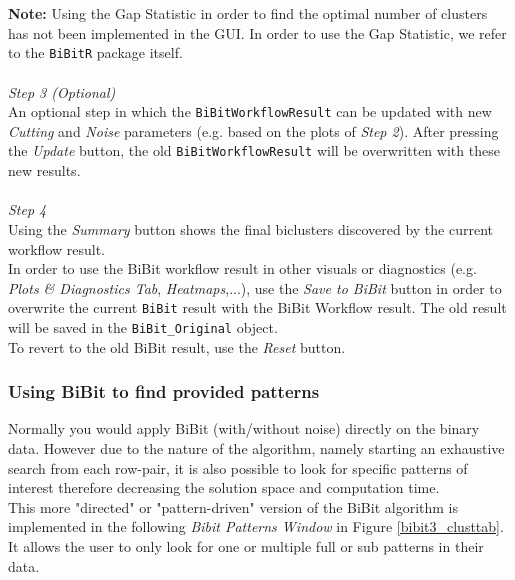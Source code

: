 \documentclass[a4paper]{article}\usepackage[]{graphicx}\usepackage[]{color}
\begin{document}
\\ \\
{\bf Note:} Using the Gap Statistic in order to find the optimal number of clusters has not been implemented in the GUI. In order to use the Gap Statistic, we refer to the \texttt{BiBitR} package itself.
\\ \\
{\it Step 3 (Optional)}\\
An optional step in which the \texttt{BiBitWorkflowResult} can be updated with new {\it Cutting} and {\it Noise} parameters (e.g. based on the plots of {\it Step 2}). After pressing the {\it Update} button, the old \texttt{BiBitWorkflowResult} will be overwritten with these new results.
\\ \\
{\it Step 4}\\
Using the {\it Summary} button shows the final biclusters discovered by the current workflow result.\\
In order to use the BiBit workflow result in other visuals or diagnostics (e.g. {\it Plots \& Diagnostics Tab}, {\it Heatmaps},...), use the {\it Save to BiBit} button in order to overwrite the current \texttt{BiBit} result with the BiBit Workflow result. The old  result will be saved in the \texttt{BiBit\_Original} object.\\
To revert to the old BiBit result, use the {\it Reset} button. 



\subsubsection{Using BiBit to find provided patterns}

\noindent Normally you would apply BiBit (with/without noise) directly on the
binary data.
However due to the nature of the algorithm, namely starting an exhaustive search from each row-pair, 
it is also possible to look for specific patterns of interest therefore
decreasing the solution space and computation time.\\
This more "directed" or "pattern-driven" version of the BiBit algorithm is
implemented in the following {\it Bibit Patterns Window} in Figure
\ref{bibit3_clusttab}.  It allows the user to only look for
one or multiple full or sub patterns in their data.
\end{document}
